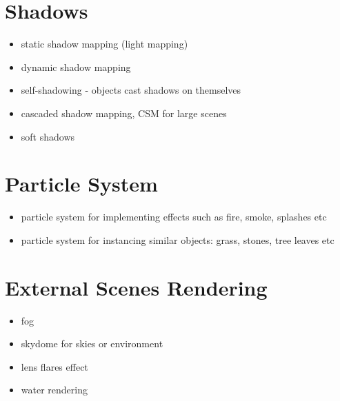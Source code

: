 \documentclass[a4paper,12pt,oneside]{sphinxmanual}
\begin{document}
\section{Shadows}
\label{features:id5}\begin{itemize}
\item {} 
static shadow mapping (light mapping)

\item {} 
dynamic shadow mapping

\item {} 
self-shadowing - objects cast shadows on themselves

\item {} 
cascaded shadow mapping, CSM for large scenes

\item {} 
soft shadows

\end{itemize}


\section{Particle System}
\label{features:id6}\begin{itemize}
\item {} 
particle system for implementing effects such as fire, smoke, splashes etc

\item {} 
particle system for instancing similar objects: grass, stones, tree leaves etc

\end{itemize}


\section{External Scenes Rendering}
\label{features:id7}\begin{itemize}
\item {} 
fog

\item {} 
skydome for skies or environment

\item {} 
lens flares effect

\item {} 
water rendering

\end{itemize}
\end{document}
